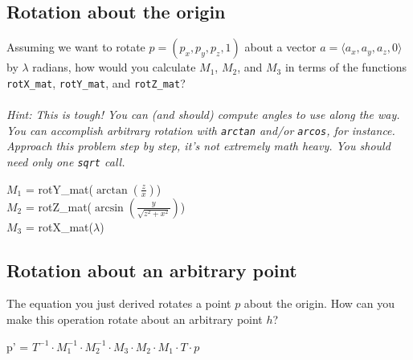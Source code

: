 \documentclass[10pt,twocolumn]{article}
\begin{document}
\subsection{Rotation about the origin}
\begin{framed}
\noindent{\bf [1.5 points]} Assuming we want to rotate $p=(p_x,p_y,p_z,1)$ about a vector $a = \langle a_x,a_y,a_z,0\rangle$ by $\lambda$ radians, how would you calculate $M_1$, $M_2$, and $M_3$ in terms of the functions {\tt rotX\_mat}, {\tt rotY\_mat}, and {\tt rotZ\_mat}?\\\\
\emph{Hint: This is tough! You can (and should) compute angles to use along the way. You can accomplish arbitrary rotation with {\tt arctan} and/or {\tt arcos}, for instance. Approach this problem step by step, it's not extremely math heavy. You should need only one {\tt sqrt} call.}
\end{framed}

\begin{framed}
$M_1$ = rotY\_mat($\arctan(\frac{z}{x})$)\\
$M_2$ = rotZ\_mat($\arcsin(\frac{y}{\sqrt{z^2 + x^2}})$)\\
$M_3$ = rotX\_mat($\lambda$)\\
\end{framed}

\subsection{Rotation about an arbitrary point}
\begin{framed}
\noindent{\bf [1 point]} The equation you just derived rotates a point $p$ about the origin. How can you make this operation rotate about an arbitrary point $h$?
\end{framed}

\begin{framed}
    p' = $T^{-1} \cdot M_1^{-1} \cdot M_2^{-1} \cdot M_3 \cdot M_2 \cdot M_1 \cdot T \cdot p$
\end{framed}
\end{document}
